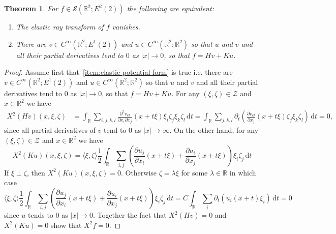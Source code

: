 \documentclass[11pt]{article}
\newcommand{\abs}[1]{\lvert #1 \rvert}
\newcommand{\inner}[1]{\langle #1 \rangle}
\renewcommand{\d}{\mathrm{d}}
\newtheorem{theorem}{Theorem}[]
\begin{document}
\begin{theorem}
\label{thm:elastic-injectivity}
For $f \in \mathcal{S}(\mathbb{R}^2;E^2(2))$ the following are equivalent:
\begin{enumerate}[label=(\alph*)]
    \item  \label{item:vanishing-elastic-ray-transform} The elastic ray transform of $f$ vanishes.
    \item \label{item:elastic-potential-form} There are $v \in C^\infty(\mathbb{R}^2;E^1(2))$ and $u \in C^\infty(\mathbb{R}^2;\mathbb{R}^2)$ so that $u$ and $v$ and all their partial derivatives tend to $0$ as $\abs{x} \to 0$, so that $f = Hv + Ku$.
\end{enumerate}
\end{theorem}

\begin{proof}
Assume first that~\ref{item:elastic-potential-form} is true i.e. there are $v \in C^\infty(\mathbb{R}^2;E^1(2))$ and $u \in C^\infty(\mathbb{R}^2;\mathbb{R}^2)$ so that $u$ and $v$ and all their partial derivatives tend to $0$ as $\abs{x} \to 0$, so that $f = Hv + Ku$. For any $(\xi,\zeta) \in \mathcal{Z}$ and $x \in \mathbb{R}^2$ we have 
\begin{equation}
\begin{split}
X^2(Hv)(x,\xi,\zeta)
&=
\int_{\mathbb{R}}
\sum_{i,j,k,l}
\frac{\partial^2v_{kl}}{\partial x_i\partial x_j}
(x + t\xi)
\xi_i\zeta_j\xi_k\zeta_l
\,\d t=
\int_{\mathbb{R}}
\sum_{j,k,l}
\partial_t
\left(
\frac{\partial v_{kl}}{\partial x_j}
(x + t\xi)
\zeta_j\xi_k\zeta_l
\right)
\,\d t=
0,
\end{split}
\end{equation}
since all partial derivatives of $v$ tend to $0$ as $\abs{x} \to \infty$. On the other hand, for any $(\xi,\zeta) \in \mathcal{Z}$ and $x \in \mathbb{R}^2$ we have
\begin{equation}
X^2(Ku)(x,\xi,\zeta)
=
\inner{\xi,\zeta}
\frac{1}{2}
\int_{\mathbb{R}}
\sum_{i,j}
\left(
\frac{\partial u_j}{\partial x_i}(x + t\xi)
+
\frac{\partial u_i}{\partial x_j}(x + t\xi)
\right)
\xi_i\zeta_j
\,\d t
\end{equation}
If $\xi \perp \zeta$, then $X^2(Ku)(x,\xi,\zeta) = 0$. Otherwise $\zeta = \lambda \xi$ for some $\lambda \in \mathbb{R}$ in which case
\begin{equation}
\inner{\xi,\zeta}
\frac{1}{2}
\int_{\mathbb{R}}
\sum_{i,j}
\left(
\frac{\partial u_j}{\partial x_i}(x + t\xi)
+
\frac{\partial u_i}{\partial x_j}(x + t\xi)
\right)
\xi_i\zeta_j
\,\d t
=
C
\int_{\mathbb{R}}
\sum_i
\partial_t( u_i (x + t) \xi_i) \,\d t
=
0
\end{equation}
since $u$ tends to $0$ as $\abs{x} \to 0$. Together the fact that $X^2(Hv) = 0$ and $X^2(Ku) = 0$ show that $X^2f = 0$.


\end{proof}
\end{document}

